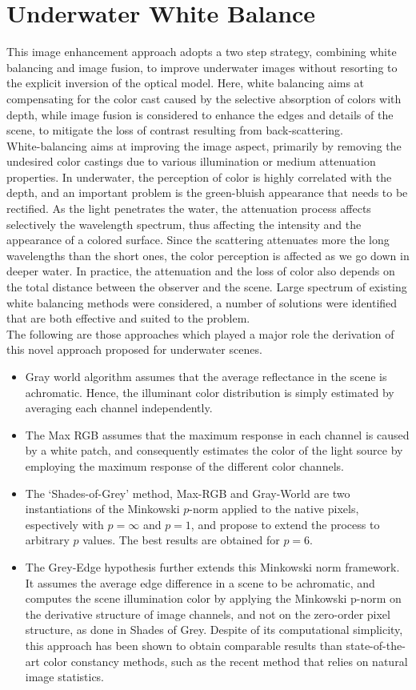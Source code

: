 \documentclass[hidelinks, 12pt]{report}
\begin{document}
\chapter{Underwater White Balance}
\justify
This image enhancement approach adopts a two step strategy, combining white balancing and image fusion, to improve underwater images without resorting to the explicit inversion of the optical model. Here, white balancing aims at compensating for the color cast caused by the selective absorption of colors with depth, while image fusion is considered to enhance the edges and details of the scene, to mitigate the loss of contrast resulting from back-scattering.\\ White-balancing aims at improving the image aspect, primarily by removing the undesired color castings due to various illumination or medium attenuation properties. In underwater, the perception of color is highly correlated with the depth, and an important problem is the green-bluish appearance that needs to be rectified. As the light penetrates the water, the attenuation process affects selectively the wavelength spectrum, thus affecting the intensity and the appearance of a colored surface. Since the scattering attenuates more the long wavelengths than the short ones, the color perception is affected as we go down in deeper water. In practice, the attenuation and the loss of color also depends on the total distance between the observer and the scene. Large spectrum of existing white balancing methods were considered, a number of solutions were identified that are both effective and suited to the problem.\\ The following are those approaches which played a major role the derivation of this novel approach proposed for underwater scenes.
\begin{itemize}
\item{Gray world algorithm assumes that the average reflectance in the scene is achromatic. Hence, the illuminant color distribution is simply estimated by averaging each channel independently.}
\item{The Max RGB assumes that the maximum response in each channel is caused by a white patch, and consequently estimates the color of the light source by employing the maximum response of the different color channels.}
\item{The ‘Shades-of-Grey’ method, Max-RGB and Gray-World are two instantiations of the Minkowski $p$-norm applied to the native pixels,  espectively with $p=\infty$ and $p=1$, and propose to extend the process to arbitrary $p$ values. The best results are obtained for $p=6$.}
\item{The Grey-Edge hypothesis further extends this Minkowski norm framework. It assumes the average edge difference in a scene to be achromatic, and computes the scene illumination color by applying the Minkowski p-norm on the derivative structure of image channels, and not on the zero-order pixel structure, as done in Shades of Grey. Despite of its computational simplicity, this approach has been shown to obtain comparable results than state-of-the-art color constancy methods, such as the recent method that relies on natural image statistics.}
\end{itemize}
\end{document}
